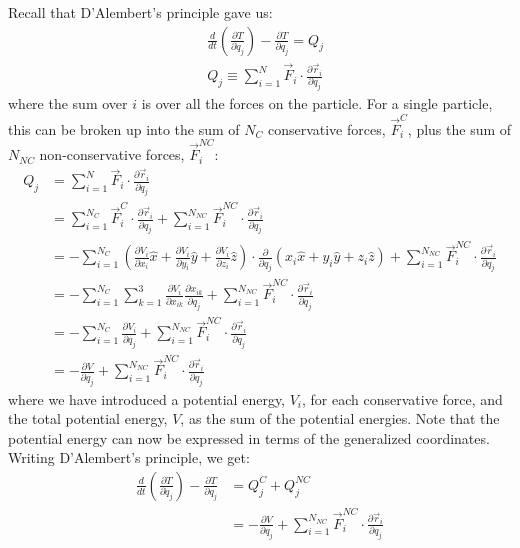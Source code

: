 Recall that D'Alembert's principle gave us:
\begin{align}
&\frac{d}{dt}\left(\frac{\partial T}{\partial \dot{q}_j} \right) - \frac{\partial T}{\partial q_j}=Q_j\nonumber\\
&Q_j\equiv \sum_{i=1}^N\vec{F}_i\cdot\frac{\partial\vec{r}_i}{\partial q_j}
\end{align}
where the sum over $i$ is over all the forces on the particle. For a single particle, this can be broken up into the sum of $N_C$ conservative forces, $\vec{F}_i^{C}$, plus the sum of $N_{NC}$ non-conservative forces, $\vec{F}_i^{NC}$:
\begin{align}
Q_j&=\sum_{i=1}^N\vec{F}_i\cdot\frac{\partial\vec{r}_i}{\partial q_j}\nonumber\\
   &=\sum_{i=1}^{N_C}\vec{F}_i^{C}\cdot\frac{\partial\vec{r}_i}{\partial q_j}+\sum_{i=1}^{N_{NC}}\vec{F}_i^{NC}\cdot\frac{\partial\vec{r}_i}{\partial q_j}\nonumber\\
   &=-\sum_{i=1}^{N_C}(\frac{\partial V_i}{\partial x_i}\hat{x}+\frac{\partial V_i}{\partial y_i}\hat{y}+\frac{\partial V_i}{\partial z_i}\hat{z} )\cdot\frac{\partial}{\partial q_j}(x_i\hat{x}+y_i\hat{y}+z_i\hat{z}) +\sum_{i=1}^{N_{NC}}\vec{F}_i^{NC}\cdot\frac{\partial\vec{r}_i}{\partial q_j}\nonumber\\
   &=-\sum_{i=1}^{N_C}\sum_{k=1}^{3}\frac{\partial V_i}{\partial x_{ik}} \frac{\partial x_{ik}}{\partial q_j}+ \sum_{i=1}^{N_{NC}}\vec{F}_i^{NC}\cdot\frac{\partial\vec{r}_i}{\partial q_j}\nonumber\\
   &=-\sum_{i=1}^{N_C}\frac{\partial V_i}{\partial q_j} +\sum_{i=1}^{N_{NC}}\vec{F}_i^{NC}\cdot\frac{\partial\vec{r}_i}{\partial q_j}\nonumber\\
   &=-\frac{\partial V}{\partial q_j} +\sum_{i=1}^{N_{NC}}\vec{F}_i^{NC}\cdot\frac{\partial\vec{r}_i}{\partial q_j}
\end{align}
where we have introduced a potential energy, $V_i$, for each conservative force, and the total potential energy, $V$, as the sum of the potential energies. Note that the potential energy can now be expressed in terms of the generalized coordinates. Writing D'Alembert's principle, we get:
\begin{align}
\frac{d}{dt}\left(\frac{\partial T}{\partial \dot{q}_j} \right) - \frac{\partial T}{\partial q_j}&=Q_j^{C}+Q_j^{NC}\nonumber\\
&=-\frac{\partial V}{\partial q_j} +\sum_{i=1}^{N_{NC}}\vec{F}_i^{NC}\cdot\frac{\partial\vec{r}_i}{\partial q_j}
\end{align}
